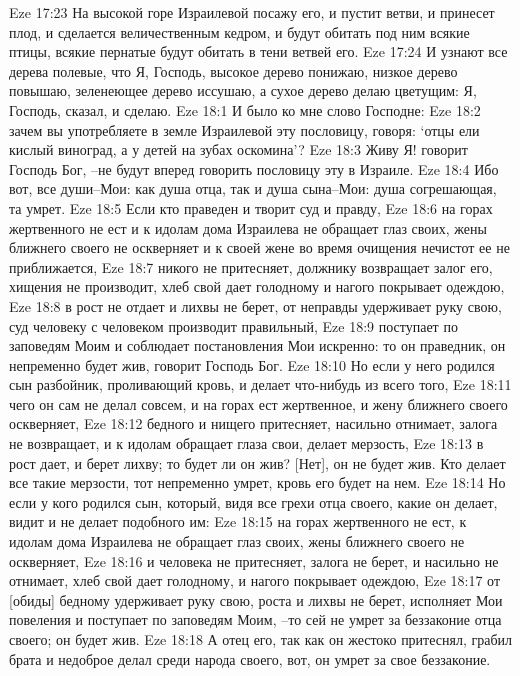 Eze 17:23  На высокой горе Израилевой посажу его, и пустит ветви, и принесет плод, и сделается величественным кедром, и будут обитать под ним всякие птицы, всякие пернатые будут обитать в тени ветвей его.
Eze 17:24  И узнают все дерева полевые, что Я, Господь, высокое дерево понижаю, низкое дерево повышаю, зеленеющее дерево иссушаю, а сухое дерево делаю цветущим: Я, Господь, сказал, и сделаю.
Eze 18:1  И было ко мне слово Господне:
Eze 18:2  зачем вы употребляете в земле Израилевой эту пословицу, говоря: `отцы ели кислый виноград, а у детей на зубах оскомина'?
Eze 18:3  Живу Я! говорит Господь Бог, --не будут вперед говорить пословицу эту в Израиле.
Eze 18:4  Ибо вот, все души--Мои: как душа отца, так и душа сына--Мои: душа согрешающая, та умрет.
Eze 18:5  Если кто праведен и творит суд и правду,
Eze 18:6  на горах жертвенного не ест и к идолам дома Израилева не обращает глаз своих, жены ближнего своего не оскверняет и к своей жене во время очищения нечистот ее не приближается,
Eze 18:7  никого не притесняет, должнику возвращает залог его, хищения не производит, хлеб свой дает голодному и нагого покрывает одеждою,
Eze 18:8  в рост не отдает и лихвы не берет, от неправды удерживает руку свою, суд человеку с человеком производит правильный,
Eze 18:9  поступает по заповедям Моим и соблюдает постановления Мои искренно: то он праведник, он непременно будет жив, говорит Господь Бог.
Eze 18:10  Но если у него родился сын разбойник, проливающий кровь, и делает что-нибудь из всего того,
Eze 18:11  чего он сам не делал совсем, и на горах ест жертвенное, и жену ближнего своего оскверняет,
Eze 18:12  бедного и нищего притесняет, насильно отнимает, залога не возвращает, и к идолам обращает глаза свои, делает мерзость,
Eze 18:13  в рост дает, и берет лихву; то будет ли он жив? [Нет], он не будет жив. Кто делает все такие мерзости, тот непременно умрет, кровь его будет на нем.
Eze 18:14  Но если у кого родился сын, который, видя все грехи отца своего, какие он делает, видит и не делает подобного им:
Eze 18:15  на горах жертвенного не ест, к идолам дома Израилева не обращает глаз своих, жены ближнего своего не оскверняет,
Eze 18:16  и человека не притесняет, залога не берет, и насильно не отнимает, хлеб свой дает голодному, и нагого покрывает одеждою,
Eze 18:17  от [обиды] бедному удерживает руку свою, роста и лихвы не берет, исполняет Мои повеления и поступает по заповедям Моим, --то сей не умрет за беззаконие отца своего; он будет жив.
Eze 18:18  А отец его, так как он жестоко притеснял, грабил брата и недоброе делал среди народа своего, вот, он умрет за свое беззаконие.

